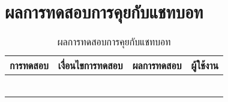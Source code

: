\section{ผลการทดสอบการคุยกับแชทบอท}
\begin{table}[H]
	\caption{ผลการทดสอบการคุยกับแชทบอท}
    \centering	
	\label{tab:test9}
    \begin{tabular}{ | p{4cm} | p{4cm} | p{4cm} | p{2cm} | }
		\hline
	\multicolumn{1}{|c|}{การทดสอบ} & \multicolumn{1}{c|}{เงื่อนไขการทดสอบ} & \multicolumn{1}{c|}{ผลการทดสอบ} & \multicolumn{1}{c|}{ผู้ใช้งาน}                             \\ \hline
	\setstretch{1.0}{ทดสอบคุยกับแชทบอท}
	& \setstretch{1.0}{ผู้ใช้เข้ามาในหน้าแชทบอท}
	& \setstretch{1.0}{ระบบจะแสดงหน้าหน้าแชทบอท} 
	&\setstretch{1.0}{\begin{flushleft}ผู้ใช้งาน\end{flushleft}} \\ \cline{2-3} 
	& \setstretch{1.0}{ผู้ใช้ส่งข้อความโดยไม่ระบุข้อความ} 
	& \setstretch{1.0}{ระบบจะไม่ส่งข้อความไปยังแชทบอท} 
	&\setstretch{1.0}{}\\ \cline{2-3} 
	& \setstretch{1.0}{ผู้ใช้ส่งข้อความโดยระบุข้อความ} 
	& \setstretch{1.0}{ระบบจะส่งข้อความไปยังแชทบอท} 
	&\setstretch{1.0}{}\\ \cline{2-3} 
	& \setstretch{1.0}{ผู้ใช้กดเลือกปุ่มพิมพ์ด้วยเสียง และพูด} 
	& \setstretch{1.0}{ระบบจะแปลงเสียงเป็นข้อความแล้วส่งไปยังแชทบอท} 
	&\setstretch{1.0}{}\\ \cline{2-3} 
	& \setstretch{1.0}{ผู้ใช้กดเลือกปุ่มพิมพ์ด้วยเสียง และไม่พูด} 
	& \setstretch{1.0}{ระบบจะไม่ส่งข้อความไปยังแชทบอท} 
	&\setstretch{1.0}{}\\ \cline{2-3} 
	& \setstretch{1.0}{เมื่อผู้ใช้กดปุ่มฟังเสียงที่ข้อความ} 
	& \setstretch{1.0}{ระบบจะพูดตามข้อความที่แชทบอทได้ส่งกลับคืนมา} 
	&\setstretch{1.0}{}\\ \cline{2-3} \hline
    \end{tabular}
\end{table}

